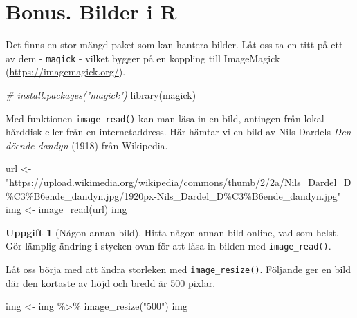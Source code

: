 \documentclass[
]{book}
\newenvironment{Shaded}{\begin{snugshade}}{\end{snugshade}}
\newcommand{\CommentTok}[1]{\textcolor[rgb]{0.56,0.35,0.01}{\textit{#1}}}
\newcommand{\FunctionTok}[1]{\textcolor[rgb]{0.00,0.00,0.00}{#1}}
\newcommand{\NormalTok}[1]{#1}
\newcommand{\OtherTok}[1]{\textcolor[rgb]{0.56,0.35,0.01}{#1}}
\newcommand{\SpecialCharTok}[1]{\textcolor[rgb]{0.00,0.00,0.00}{#1}}
\newcommand{\StringTok}[1]{\textcolor[rgb]{0.31,0.60,0.02}{#1}}
\theoremstyle{definition}
\theoremstyle{definition}
\theoremstyle{definition}
\newtheorem{exercise}{Uppgift}[chapter]
\theoremstyle{definition}
\theoremstyle{remark}
\begin{document}
\hypertarget{bonus.-bilder-i-r}{%
\section{Bonus. Bilder i R}\label{bonus.-bilder-i-r}}

Det finns en stor mängd paket som kan hantera bilder. Låt oss ta en titt på ett av dem - \texttt{magick} - vilket bygger på en koppling till ImageMagick (\url{https://imagemagick.org/}).

\begin{Shaded}
\begin{Highlighting}[]
\CommentTok{\# install.packages("magick")}
\FunctionTok{library}\NormalTok{(magick)}
\end{Highlighting}
\end{Shaded}

Med funktionen \texttt{image\_read()} kan man läsa in en bild, antingen från lokal hårddisk eller från en internetaddress. Här hämtar vi en bild av Nils Dardels \emph{Den döende dandyn} (1918) från Wikipedia.

\begin{Shaded}
\begin{Highlighting}[]
\NormalTok{url }\OtherTok{\textless{}{-}} \StringTok{"https://upload.wikimedia.org/wikipedia/commons/thumb/2/2a/Nils\_Dardel\_D\%C3\%B6ende\_dandyn.jpg/1920px{-}Nils\_Dardel\_D\%C3\%B6ende\_dandyn.jpg"}
\NormalTok{img }\OtherTok{\textless{}{-}} \FunctionTok{image\_read}\NormalTok{(url)}
\NormalTok{img}
\end{Highlighting}
\end{Shaded}

\begin{exercise}[Någon annan bild]
Hitta någon annan bild online, vad som helst. Gör lämplig ändring i stycken ovan för att läsa in bilden med \texttt{image\_read()}.
\end{exercise}

Låt oss börja med att ändra storleken med \texttt{image\_resize()}. Följande ger en bild där den kortaste av höjd och bredd är 500 pixlar.

\begin{Shaded}
\begin{Highlighting}[]
\NormalTok{img }\OtherTok{\textless{}{-}}\NormalTok{ img }\SpecialCharTok{\%\textgreater{}\%} 
  \FunctionTok{image\_resize}\NormalTok{(}\StringTok{"500"}\NormalTok{)}
\NormalTok{img}
\end{Highlighting}
\end{Shaded}
\end{document}
